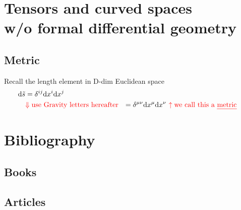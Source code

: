\documentclass[11pt,fleqn]{book} %
\begin{document}
\chapter{Tensors and curved spaces \\w/o formal differential geometry}

\section{Metric}
Recall the length element in D-dim Euclidean space \\
\begin{align}
  \mathrm{d} \tilde{s} &= \delta^{ij} \mathrm{d} x^i \mathrm{d} x^j \\
                       & \textcolor{red}{\Downarrow \text{use Gravity letters hereafter}}
                       &= \delta^{\mu \nu} \mathrm{d} x^\mu \mathrm{d} x^\nu
                       &\ \textcolor{red}{\uparrow \text{we call this a \uline{metric}}}

\end{align}



\chapter*{Bibliography}
\section*{Books}
\printbibliography[heading=bibempty,type=book]
\section*{Articles}
\printbibliography[heading=bibempty,type=article]


\cleardoublepage
{}
\setlength{\columnsep}{0.75cm}
\printindex

\end{document}
